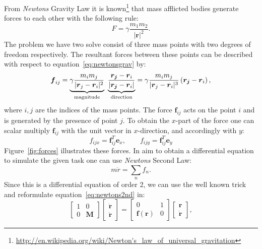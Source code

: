 \documentclass[11pt,a4paper,oneside]{scrartcl}
\begin{document}
From \textit{Newtons} Gravity Law it is known\footnote{\url{http://en.wikipedia.org/wiki/Newton's_law_of_universal_gravitation}} that mass afflicted bodies generate forces to each other with the following rule:
\begin{equation}
F = \gamma \frac{m_1m_2}{|\boldsymbol{r}|^2}.
\label{eq:newtonsgrav}
\end{equation}
The problem we have two solve consist of three mass points with two degrees of freedom respectively. The resultant forces between these points can be described with respect to equation~\ref{eq:newtonsgrav} by:
\begin{equation}
\boldsymbol{f}_{ij} = \underbrace{\gamma \frac{m_im_j}{|\boldsymbol{r}_j-\boldsymbol{r}_i|^2}}_{\textnormal{magnitude}} ~ \underbrace{\frac{\boldsymbol{r_j}-\boldsymbol{r}_i}{|\boldsymbol{r_j}-\boldsymbol{r}_i|}}_{\textnormal{direction}} = \gamma \frac{m_im_j}{|\boldsymbol{r}_j-\boldsymbol{r}_i|^3} \left( \boldsymbol{r_j}-\boldsymbol{r}_i \right),
\label{eq:forces}
\end{equation}
where $i,j$ are the indices of the mass points. The force $\boldsymbol{f}_{ij}$ acts on the point $i$ and is generated by the presence of point $j$. To obtain the $x$-part of the force one can scalar multiply $\boldsymbol{f}_{ij}$ with the unit vector in $x$-direction, and accordingly with $y$:
\begin{equation}
{f}_{ijx} = \boldsymbol{f}_{ij}^T\boldsymbol{e}_{x} ,\qquad {f}_{ijy} = \boldsymbol{f}_{ij}^T\boldsymbol{e}_{y} 
\end{equation}
Figure~\ref{fig:forces} illustrates these forces.
In aim to obtain a differential equation to simulate the given task one can use \textit{Newtons} Second Law:
\begin{equation}
m\ddot{r} = \sum\limits_n f_n.
\label{eq:newtons2nd}
\end{equation}
Since this is a differential equation of order 2, we can use the well known trick and reformulate equation~\ref{eq:newtons2nd} in:
\begin{equation}
\left[
\begin{matrix}
1 & 0 \\
0 & \boldsymbol{M} 
\end{matrix}
\right]
\left[
\begin{matrix}
\dot{\boldsymbol{r}} \\
\ddot{\boldsymbol{r}}
\end{matrix}
\right]
= 
\left[
\begin{matrix}
0 & 1 \\
\boldsymbol{f}(\boldsymbol{r}) & 0 
\end{matrix}
\right]
\left[
\begin{matrix}
{\boldsymbol{r}} \\
\dot{\boldsymbol{r}}
\end{matrix}
\right]
\label{eq:soe},
\end{equation}
\end{document}
